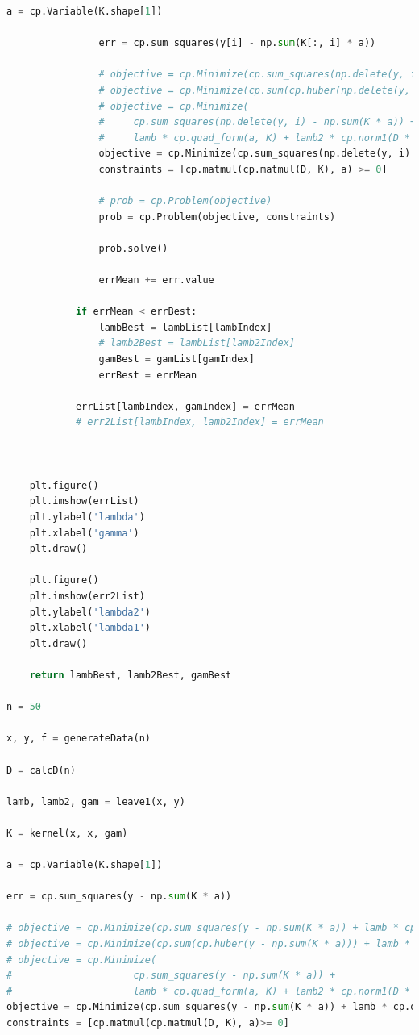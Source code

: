 \documentclass{article}
\newcommand{\1}{\mathbf{1}}
\begin{document}
\begin{lstlisting}[language=Python]
                a = cp.Variable(K.shape[1])

                err = cp.sum_squares(y[i] - np.sum(K[:, i] * a))

                # objective = cp.Minimize(cp.sum_squares(np.delete(y, i) - np.sum(K * a)) + lamb * cp.quad_form(a, K))
                # objective = cp.Minimize(cp.sum(cp.huber(np.delete(y, i) - np.sum(K * a))) + lamb * cp.quad_form(a, K))
                # objective = cp.Minimize(
                #     cp.sum_squares(np.delete(y, i) - np.sum(K * a)) +
                #     lamb * cp.quad_form(a, K) + lamb2 * cp.norm1(D * (K * a)))
                objective = cp.Minimize(cp.sum_squares(np.delete(y, i) - np.sum(K * a)) + lamb * cp.quad_form(a, K))
                constraints = [cp.matmul(cp.matmul(D, K), a) >= 0]

                # prob = cp.Problem(objective)
                prob = cp.Problem(objective, constraints)

                prob.solve()

                errMean += err.value

            if errMean < errBest:
                lambBest = lambList[lambIndex]
                # lamb2Best = lambList[lamb2Index]
                gamBest = gamList[gamIndex]
                errBest = errMean

            errList[lambIndex, gamIndex] = errMean
            # err2List[lambIndex, lamb2Index] = errMean



    plt.figure()
    plt.imshow(errList)
    plt.ylabel('lambda')
    plt.xlabel('gamma')
    plt.draw()

    plt.figure()
    plt.imshow(err2List)
    plt.ylabel('lambda2')
    plt.xlabel('lambda1')
    plt.draw()

    return lambBest, lamb2Best, gamBest

n = 50

x, y, f = generateData(n)

D = calcD(n)

lamb, lamb2, gam = leave1(x, y)

K = kernel(x, x, gam)

a = cp.Variable(K.shape[1])

err = cp.sum_squares(y - np.sum(K * a))

# objective = cp.Minimize(cp.sum_squares(y - np.sum(K * a)) + lamb * cp.quad_form(a, K))
# objective = cp.Minimize(cp.sum(cp.huber(y - np.sum(K * a))) + lamb * cp.quad_form(a, K))
# objective = cp.Minimize(
#                     cp.sum_squares(y - np.sum(K * a)) +
#                     lamb * cp.quad_form(a, K) + lamb2 * cp.norm1(D * (K * a)))
objective = cp.Minimize(cp.sum_squares(y - np.sum(K * a)) + lamb * cp.quad_form(a, K))
constraints = [cp.matmul(cp.matmul(D, K), a)>= 0]


\end{lstlisting}
\end{document}
